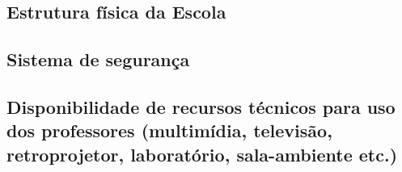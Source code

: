 \hspace{1.5cm}
\subsection*{Estrutura física da Escola}

\subsection*{Sistema de segurança}

\subsection*{Disponibilidade de recursos técnicos para uso dos professores (multimídia, televisão, retroprojetor, laboratório, sala-ambiente etc.)}